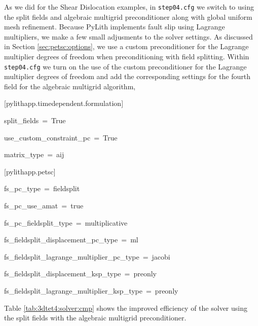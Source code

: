 As we did for the Shear Dislocation examples, in \texttt{step04.cfg}
we switch to using the split fields and algebraic multigrid preconditioner
along with global uniform mesh refinement. Because PyLith implements
fault slip using Lagrange multipliers, we make a few small adjusments
to the solver settings. As discussed in Section \ref{sec:petsc:options},
we use a custom preconditioner for the Lagrange multiplier degrees
of freedom when preconditioning with field splitting. Within \texttt{step04.cfg}
we turn on the use of the custom preconditioner for the Lagrange multiplier
degrees of freedom and add the corresponding settings for the fourth
field for the algebraic multigrid algorithm,
\begin{lyxcode}
{[}pylithapp.timedependent.formulation{]}

split\_fields~=~True

use\_custom\_constraint\_pc~=~True

matrix\_type~=~aij



{[}pylithapp.petsc{]}

fs\_pc\_type~=~fieldsplit

fs\_pc\_use\_amat~=~true

fs\_pc\_fieldsplit\_type~=~multiplicative

fs\_fieldsplit\_displacement\_pc\_type~=~ml

fs\_fieldsplit\_lagrange\_multiplier\_pc\_type~=~jacobi

fs\_fieldsplit\_displacement\_ksp\_type~=~preonly

fs\_fieldsplit\_lagrange\_multiplier\_ksp\_type~=~preonly
\end{lyxcode}
Table \ref{tab:3dtet4:solver:cmp} shows the improved efficiency of
the solver using the split fields with the algebraic multigrid preconditioner.
